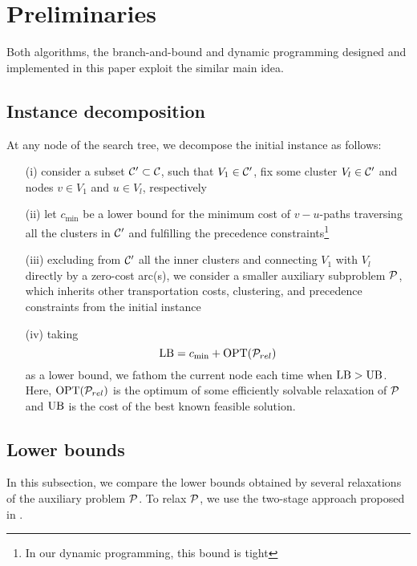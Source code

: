 \section{Preliminaries}\label{sec:pre}
Both algorithms, the branch-and-bound and dynamic programming designed and implemented in this paper exploit the similar main idea. 

\subsection{Instance decomposition}
At any node of the search tree, we decompose the initial instance as follows: 
\begin{itemize}
	\item[(i)] consider a subset $\CX'\subset\CX$, such that $V_1\in\CX'$, fix some cluster $V_l\in\CX'$ and nodes $v\in V_1$ and $u\in V_l$, respectively
	\item[(ii)] let $c_{\min}$ be a lower bound for the minimum cost of $v-u$-paths traversing all the clusters in $\CX'$ and fulfilling the precedence constraints\footnote{In our dynamic programming, this bound is tight} 
	\item[(iii)] excluding from $\CX'$ all the inner clusters and connecting $V_1$ with $V_l$ directly by a zero-cost arc(s), we consider a smaller auxiliary subproblem $\P$, which inherits other transportation costs, clustering, and precedence constraints from the initial instance 
	\item[(iv)] taking 
	\begin{equation}\label{e:bounds}
		\LB = c_{\min} + \OPT{\P_{rel}}
	\end{equation}
	as a lower bound, we fathom the current node each time when $\LB > \UB$. Here, $\OPT{\P_{rel}}$ is the optimum of some efficiently solvable relaxation of $\P$ and $\UB$ is the cost of the best known feasible solution.
\end{itemize}
\subsection{Lower bounds}\label{ssec:LBs}
In this subsection, we compare the lower bounds obtained by several relaxations of the auxiliary problem $\P$. To relax $\P$, we use the two-stage approach proposed in \cite{SALMAN2020163}. 

